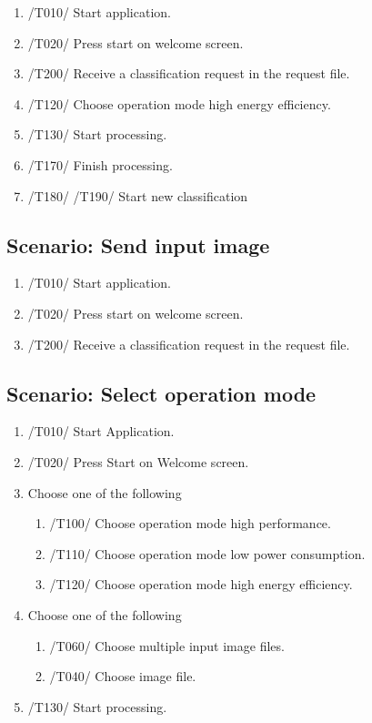\documentclass[parskip=full]{scrartcl}
\begin{document}
\begin{enumerate}
	\item /T010/ Start application. 
	\item /T020/ Press start on welcome screen.
	\item /T200/ Receive a classification request in the request file.
	\item /T120/ Choose operation mode high energy efficiency.
	\item /T130/ Start processing.
	\item /T170/ Finish processing.
	\item /T180/ /T190/ Start new classification
\end{enumerate}

\subsection {Scenario: Send input image}

\begin{enumerate}
	\item /T010/ Start application. 
	\item /T020/ Press start on welcome screen.
	\item /T200/ Receive a classification request in the request file.
\end{enumerate}

\pagebreak


\subsection {Scenario: Select operation mode}

\begin{enumerate}
	\item /T010/ Start Application.
	\item /T020/ Press Start on Welcome screen.
	\item Choose one of the following
	\begin{enumerate}
		\item /T100/ Choose operation mode high performance.
		\item /T110/ Choose operation mode low power consumption.
		\item /T120/ Choose operation mode high energy efficiency.
	\end{enumerate}
	\item Choose one of the following
	\begin{enumerate}
		\item /T060/ Choose multiple input image files.
		\item /T040/ Choose image file.
	\end{enumerate}
	\item /T130/ Start processing.
\end{enumerate}
\end{document}
